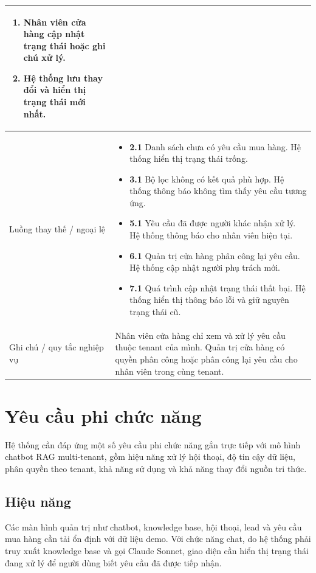 \documentclass[../DoAn.tex]{subfiles}
\begin{document}
\begin{longtable}{|p{}|p{}|}
\begin{minipage}[t]{0.68\textwidth}
\begin{enumerate}
    \item Nhân viên cửa hàng cập nhật trạng thái hoặc ghi chú xử lý.
    \item Hệ thống lưu thay đổi và hiển thị trạng thái mới nhất.
\end{enumerate}
\end{minipage}
\\
\hline
Luồng thay thế / ngoại lệ &
\begin{minipage}[t]{0.68\textwidth}
\begin{itemize}
    \item \textbf{2.1} Danh sách chưa có yêu cầu mua hàng. Hệ thống hiển thị trạng thái trống.
    \item \textbf{3.1} Bộ lọc không có kết quả phù hợp. Hệ thống thông báo không tìm thấy yêu cầu tương ứng.
    \item \textbf{5.1} Yêu cầu đã được người khác nhận xử lý. Hệ thống thông báo cho nhân viên hiện tại.
    \item \textbf{6.1} Quản trị cửa hàng phân công lại yêu cầu. Hệ thống cập nhật người phụ trách mới.
    \item \textbf{7.1} Quá trình cập nhật trạng thái thất bại. Hệ thống hiển thị thông báo lỗi và giữ nguyên trạng thái cũ.
\end{itemize}
\end{minipage}
\\
\hline
Ghi chú / quy tắc nghiệp vụ & Nhân viên cửa hàng chỉ xem và xử lý yêu cầu thuộc tenant của mình. Quản trị cửa hàng có quyền phân công hoặc phân công lại yêu cầu cho nhân viên trong cùng tenant. \\
\hline
\end{longtable}

\section{Yêu cầu phi chức năng}
\label{section:2.4}

Hệ thống cần đáp ứng một số yêu cầu phi chức năng gắn trực tiếp với mô hình chatbot RAG multi-tenant, gồm hiệu năng xử lý hội thoại, độ tin cậy dữ liệu, phân quyền theo tenant, khả năng sử dụng và khả năng thay đổi nguồn tri thức.

\subsection{Hiệu năng}

Các màn hình quản trị như chatbot, knowledge base, hội thoại, lead và yêu cầu mua hàng cần tải ổn định với dữ liệu demo. Với chức năng chat, do hệ thống phải truy xuất knowledge base và gọi Claude Sonnet, giao diện cần hiển thị trạng thái đang xử lý để người dùng biết yêu cầu đã được tiếp nhận.
\end{document}
